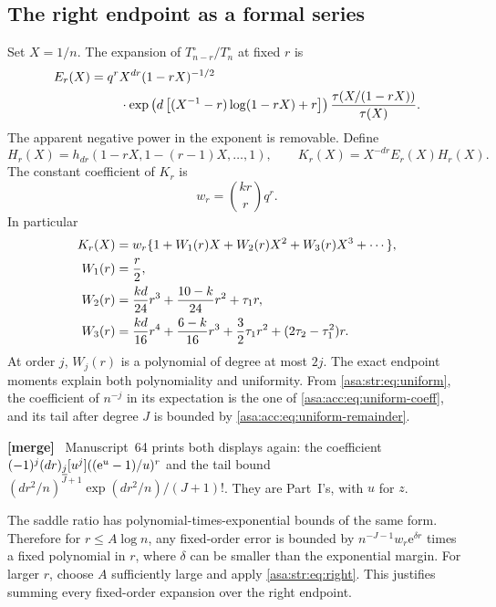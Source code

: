 \documentclass[11pt,letterpaper]{article}
\theoremstyle{remark}\newtheorem{remark}[theorem]{Remark}
\numberwithin{equation}{section}
\newcommand{\ee}{\mathrm e}
\newenvironment{mergenote}{\par\smallskip\begingroup\small
 \noindent\textbf{[merge]}\ }{\par\endgroup\smallskip}
\begin{document}
\subsection{The right endpoint as a formal series}
Set $X=1/n$. The expansion of $T^{\circ}_{n-r}/T^{\circ}_n$ at fixed $r$ is
\begin{align}
 E_r(X)={}&q^rX^{dr}(1-rX)^{-1/2}\notag\\
 &\quad\cdot\exp\left(d\left[(X^{-1}-r)\log(1-rX)+r\right]\right)
 \frac{\tau(X/(1-rX))}{\tau(X)}.\label{asa:str:eq:Er}
\end{align}
The apparent negative power in the exponent is removable. Define
\begin{equation}\label{asa:str:eq:Kr}
 H_r(X)=h_{dr}(1-rX,1-(r-1)X,\ldots,1),\qquad
 K_r(X)=X^{-dr}E_r(X)H_r(X).
\end{equation}
The constant coefficient of $K_r$ is
\[
 w_r=\binom{kr}r q^r.
\]
In particular
\begin{align}
 K_r(X)&=w_r\{1+W_1(r)X+W_2(r)X^2+W_3(r)X^3+\cdots\},\label{asa:str:eq:W}\\
 W_1(r)&=\frac r2,\notag\\
 W_2(r)&=\frac{kd}{24}r^3+\frac{10-k}{24}r^2+\tau_1r,\notag\\
 W_3(r)&=\frac{kd}{16}r^4+\frac{6-k}{16}r^3
 +\frac32\tau_1r^2+(2\tau_2-\tau_1^2)r.\notag
\end{align}
At order $j$, $W_j(r)$ is a polynomial of degree at most $2j$. The exact endpoint moments explain both polynomiality and uniformity. From \eqref{asa:str:eq:uniform}, the coefficient of $n^{-j}$ in its expectation is the one of \eqref{asa:acc:eq:uniform-coeff}, and its tail after degree $J$ is bounded by \eqref{asa:acc:eq:uniform-remainder}.
\begin{mergenote}
Manuscript~64 prints both displays again: the coefficient
$(-1)^j\fall{dr}{j}[u^j]((\ee^u-1)/u)^r$ and the tail bound
$(dr^2/n)^{J+1}\exp(dr^2/n)/(J+1)!$. They are Part~I's, with $u$ for $z$.
\end{mergenote}
\noindent The saddle ratio has polynomial-times-exponential bounds of the same form. Therefore for $r\le A\log n$, any fixed-order error is bounded by
$n^{-J-1}w_r\ee^{\delta r}$ times a fixed polynomial in $r$, where $\delta$ can be smaller than the exponential margin. For larger $r$, choose $A$ sufficiently large and apply \eqref{asa:str:eq:right}. This justifies summing every fixed-order expansion over the right endpoint.
\end{document}
